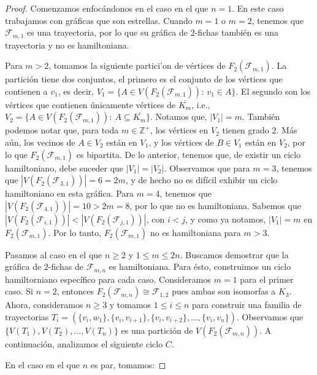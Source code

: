 \begin{proof}
    Comenzamos enfoc\'andonos en el caso en el que $n=1$. En este caso
    trabajamos con gr\'aficas que son estrellas. Cuando $m=1$ o $m=2$, tenemos
    que $\mathcal{F}_{m,1}$ es una trayectoria, por lo que su gr\'afica de
    $2$-fichas tambi\'en es una trayectoria y no es hamiltoniana. 
    
    Para $m > 2$, tomamos la siguiente partici'on de v\'ertices de
    $F_2(\mathcal{F}_{m,1})$. La partici\'on tiene dos conjuntos, el primero es
    el conjunto de los v\'ertices que contienen a $v_1$, es decir, $V_1=\{A \in
    V(F_2(\mathcal{F}_{m,1})) \colon\ v_1 \in A\}$. El segundo son los
    v\'ertices que contienen \'unicamente v\'ertices de $\overline{K_m}$, i.e.,
    $V_2=\{A \in V(F_2(\mathcal{F}_{m,1})) \colon\ A \subseteq \overline{K_m}
    \}$. Notamos que, $|V_1|=m$. Tambi\'en podemos notar que, para toda $m \in
    \mathbb{Z^+}$, los v\'ertices en $V_2$ tienen grado $2$. M\'as a\'un, los
    vecinos de $A \in V_2$ est\'an en $V_1$, y los v\'ertices de $B \in V_1$
    est\'an en $V_2$, por lo que $F_2(\mathcal{F}_{m,1})$ es bipartita. De lo
    anterior, tenemos que, de existir un ciclo hamiltoniano, debe suceder que
    $|V_1| = |V_2|$. Observamos que para $m=3$, tenemos que
    $|V(F_2(\mathcal{F}_{3,1}))| = 6 = 2m$, y de hecho no es dif\'icil exhibir
    un ciclo hamiltoniano en esta gr\'afica. Para $m=4$, tenemos que
    $|V(F_2(\mathcal{F}_{4,1}))| = 10 > 2m=8$, por lo que no es hamiltoniana.
    Sabemos que $|V(F_2(\mathcal{F}_{i,1}))| < |V(F_2(\mathcal{F}_{j,1}))|$, con
    $i<j$, y como ya notamos, $|V_1| = m$ en $F_2(\mathcal{F}_{m,1})$.   Por lo
    tanto, $F_2(\mathcal{F}_{m,1})$ no es hamiltoniana para $m >3$.

    Pasamos al caso en el que $n \geq 2$ y $1 \leq m \leq 2n$. Buscamos
    demostrar que la gr\'afica de $2$-fichas de $\mathcal{F}_{m,n}$ es
    hamiltoniana. Para \'esto, construimos un ciclo hamiltorniano espec\'ifico
    para cada caso. Consideramos $m=1$ para el primer caso. Si $n=2$, entonces
    $F_2(\mathcal{F}_{m,n}) \cong \mathcal{F}_{1,2}$ pues ambas son isomorfas a
    $K_3$. Ahora, consideramos $n \geq 3$ y tomamos $1 \leq i \leq n$ para
    construir una familia de trayectorias
    $T_i=(\{v_i,w_1\},\{v_i,v_{i+1}\},\{v_i,v_{i+2}\},\dots, \{v_i,v_n\})$.
    Observamos que $\{V(T_1),V(T_2),\dots, V(T_n)\}$ es una partici\'on de
    $V(F_2(\mathcal{F}_{m,n}))$. A continuaci\'on, analizamos el siguiente ciclo
    $C$.
    
    En el caso en el que $n$ es par, tomamos:


\end{proof}
